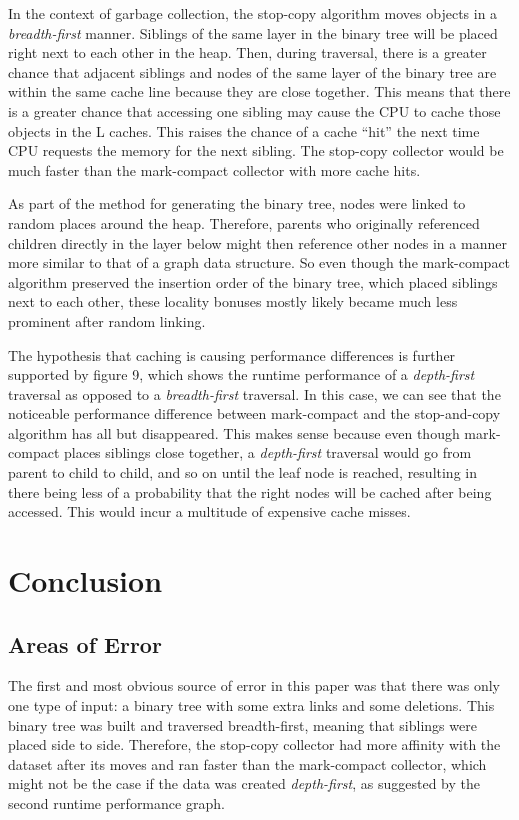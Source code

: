 \documentclass[index]{subfiles}
\begin{document}
In the context of garbage collection, the stop-copy algorithm moves objects in a \textit{breadth-first} manner. Siblings of the same layer in the binary tree will be placed right next to each other in the heap. Then, during traversal, there is a greater chance that adjacent siblings and nodes of the same layer of the binary tree are within the same cache line because they are close together. This means that there is a greater chance that accessing one sibling may cause the CPU to cache those objects in the L caches. This raises the chance of a cache ``hit'' the next time CPU requests the memory for the next sibling. The stop-copy collector would be much faster than the mark-compact collector with more cache hits.

As part of the method for generating the binary tree, nodes were linked to random places around the heap. Therefore, parents who originally referenced children directly in the layer below might then reference other nodes in a manner more similar to that of a graph data structure. So even though the mark-compact algorithm preserved the insertion order of the binary tree, which placed siblings next to each other, these locality bonuses mostly likely became much less prominent after random linking.

The hypothesis that caching is causing performance differences is further supported by figure 9, which shows the runtime performance of a \textit{depth-first} traversal as opposed to a \textit{breadth-first} traversal. In this case, we can see that the noticeable performance difference between mark-compact and the stop-and-copy algorithm has all but disappeared. This makes sense because even though mark-compact places siblings close together, a \textit{depth-first} traversal would go from parent to child to child, and so on until the leaf node is reached, resulting in there being less of a probability that the right nodes will be cached after being accessed. This would incur a multitude of expensive cache misses.

\section{Conclusion}

\subsection{Areas of Error}

The first and most obvious source of error in this paper was that there was only one type of input: a binary tree with some extra links and some deletions. This binary tree was built and traversed breadth-first, meaning that siblings were placed side to side. Therefore, the stop-copy collector had more affinity with the dataset after its moves and ran faster than the mark-compact collector, which might not be the case if the data was created \textit{depth-first}, as suggested by the second runtime performance graph.
\end{document}
